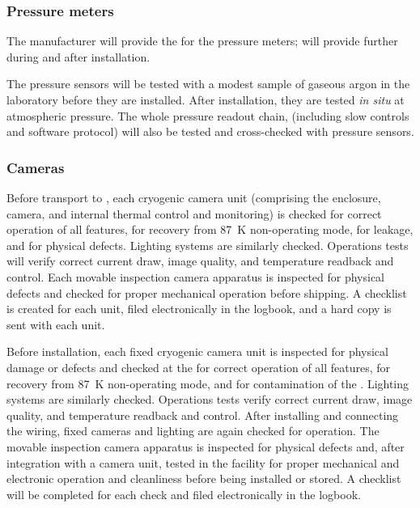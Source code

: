 \subsubsection{Pressure meters}
\label{sec:fdgen-slow-cryo-qc-press}
The manufacturer will provide the  for the pressure meters;  will provide further  during and after installation.

The pressure sensors will be tested with a modest sample of gaseous argon in the laboratory before they are installed. After installation, they are tested \textit{in situ} at atmospheric pressure. The whole pressure readout chain, (including slow controls  and software protocol) 
will also be tested and cross-checked with  pressure sensors.

\subsubsection{Cameras}
\label{sec:fdgen-slow-cryo-qc-c}

Before %
transport to \surf, each cryogenic camera unit (comprising the enclosure, camera, and internal thermal control and monitoring) %
is checked for correct operation of all features, for recovery from \SI{87}{K} non-operating mode, for leakage, and for physical defects. Lighting systems %
are similarly checked. Operations tests will verify correct current draw, image quality, and temperature readback and control. Each movable inspection camera apparatus %
is inspected for physical defects and checked for proper mechanical operation before shipping. A checklist %
is created for each unit, filed electronically in the  logbook, and a hard copy is sent with each unit. 

Before installation, each fixed cryogenic camera unit is inspected for physical damage or defects and checked at the  
for correct operation of all features, 
for recovery from \SI{87}{K} non-operating mode, and for contamination of the \lar{}. Lighting systems are similarly checked. Operations tests verify correct current draw, image quality, and temperature readback and control. After installing and connecting the wiring, fixed cameras and lighting are again  checked for operation. The movable inspection camera apparatus is inspected for physical defects and, after integration with a camera unit, tested in the facility for proper mechanical and electronic operation and cleanliness before being installed or stored. A checklist will be completed for each  check and filed electronically in the  logbook. 

